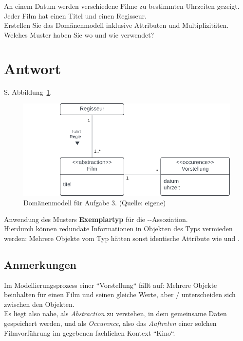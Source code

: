 An einem Datum werden verschiedene Filme zu bestimmten Uhrzeiten gezeigt.
Jeder Film hat einen Titel und einen Regisseur.\\

\noindent
Erstellen Sie das Domänenmodell inklusive Attributen und Multiplizitäten.\\

\noindent
Welches Muster haben Sie wo und wie verwendet?


\section*{Antwort}
S. Abbildung~\ref{fig:film}.

\begin{figure}
    \centering
    \includegraphics[scale=0.5]{chapters/aufgabe 3/img/film}
    \caption{Domänenmodell für Aufgabe 3. (Quelle: eigene)}
    \label{fig:film}
\end{figure}

\noindent
Anwendung des Musters \textbf{Exemplartyp} für die --Assoziation.\\

\noindent
Hierdurch können redundate Informationen in Objekten des Typs  vermieden werden: Mehrere Objekte vom Typ  hätten sonst identische Attribute wie  und .\\

\subsection*{Anmerkungen}
Im Modellierungsprozess einer ``Vorstellung`` fällt auf: Mehrere Objekte beinhalten für einen Film und seinen  gleiche Werte, aber  /  unterscheiden sich zwischen den Objekten.\\
Es liegt also nahe,  als \textit{Abstraction} zu verstehen, in dem gemeinsame Daten gespeichert werden, und  als \textit{Occurence}, also das \textit{Auftreten} einer solchen Filmvorführung im gegebenen fachlichen Kontext ``Kino``.\\

